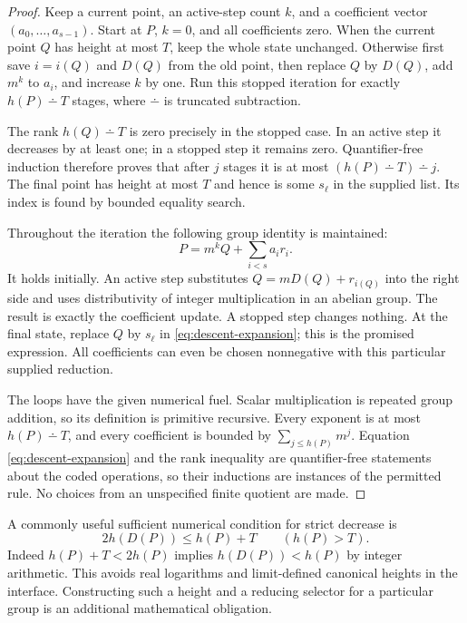 \begin{proof}
Keep a current point, an active-step count $k$, and a coefficient vector
$(a_0,\ldots,a_{s-1})$. Start at $P$, $k=0$, and all coefficients zero.
When the current point $Q$ has height at most $T$, keep the whole state
unchanged. Otherwise first save $i=i(Q)$ and $D(Q)$ from the old point,
then replace $Q$ by $D(Q)$, add $m^k$ to $a_i$, and increase $k$ by one.
Run this stopped iteration for exactly
$h(P)\mathbin{\dotminus}T$ stages, where $\dotminus$ is truncated
subtraction.

The rank $h(Q)\mathbin{\dotminus}T$ is zero precisely in the stopped
case. In an active step it decreases by at least one; in a stopped step
it remains zero. Quantifier-free induction therefore proves that after
$j$ stages it is at most
$(h(P)\mathbin{\dotminus}T)\mathbin{\dotminus}j$. The final point has
height at most $T$ and hence is some $s_\ell$ in the supplied list. Its
index is found by bounded equality search.

Throughout the iteration the following group identity is maintained:
\begin{equation}\label{eq:descent-expansion}
                   P=m^k Q+\sum_{i<s}a_i r_i.
\end{equation}
It holds initially. An active step substitutes
$Q=mD(Q)+r_{i(Q)}$ into the right side and uses distributivity of
integer multiplication in an abelian group. The result is exactly the
coefficient update. A stopped step changes nothing. At the final state,
replace $Q$ by $s_\ell$ in \eqref{eq:descent-expansion}; this is the
promised expression. All coefficients can even be chosen nonnegative
with this particular supplied reduction.

The loops have the given numerical fuel. Scalar multiplication is repeated
group addition, so its definition is primitive recursive. Every exponent
is at most $h(P)\dotminus T$, and every coefficient is bounded by
$\sum_{j\le h(P)}m^j$. Equation \eqref{eq:descent-expansion} and the rank
inequality are quantifier-free statements about the coded operations, so
their inductions are instances of the permitted rule. No choices from an
unspecified finite quotient are made.
\end{proof}

A commonly useful sufficient numerical condition for strict decrease is
\[
              2h(D(P))\le h(P)+T\qquad(h(P)>T).
\]
Indeed $h(P)+T<2h(P)$ implies $h(D(P))<h(P)$ by integer arithmetic.
This avoids real logarithms and limit-defined canonical heights in the
interface. Constructing such a height and a reducing selector for a
particular group is an additional mathematical obligation.

